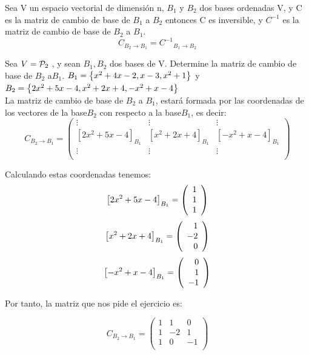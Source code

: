 \begin{theorem}[Corolario]
Sea V un espacio vectorial de dimensión n, $B_1$ y $B_2$  dos bases ordenadas V, y C es la matriz de cambio de base de $B_1$ a $B_2$ entonces C es inversible, y $C^{-1}$ es la matriz de cambio de base de $B_2$ a $B_1$.
\[
C_{B_2\rightarrow B_1 }={C^{-1}}_{B_1 \rightarrow B_2}\]
\end{theorem}

\begin{ejemplo}
Sea $V=\mathcal{P}_2$ , y sean $B_1, B_2$ dos bases de V. Determine la matriz de cambio de base de $B_2$ a$ B_1$. $ B_1= \left\{x^2+4x-2,x-3,x^2+1 \right\} $  y $B_2= \left\{2x^2+5x-4,x^2+2x+4,-x^2+x-4 \right\} $
~\\

La matriz de cambio de base de $B_2$ a $B_1$, estará formada por las coordenadas de los vectores de la base$ B_2$ con respecto a la base$ B_1$, es decir:
\[C_{B_2 \rightarrow B_1}= \left(\begin{array}{ccc}
\vdots & \vdots & \vdots \\
\left[2x^2+5x-4\right]_{B_1}&\left[x^2+2x+4\right]_{B_1}&  \left[-x^2+x-4\right]_{B_1}\\
\vdots & \vdots &  \vdots\\
\end{array}
\right)\]

Calculando estas coordenadas tenemos:
\[\left[2x^2+5x-4\right]_{B_1}=\left( \begin{array}{r} 1\\ 1\\ 1 \end{array} \right) \]
\[\left[x^2+2x+4\right]_{B_1}=\left( \begin{array}{r} 1\\ -2\\ 0 \end{array} \right) \]
\[\left[-x^2+x-4\right]_{B_1}=\left( \begin{array}{r} 0\\ 1\\ -1 \end{array} \right) \]

Por tanto, la matriz que nos pide el ejercicio es:

\[C_{B_2 \rightarrow B_1}= \left(\begin{array}{rrr}
1 & 1 & 0 \\
1&-2& 1\\
1 & 0 &  -1\\
\end{array}
\right)\]




\end{ejemplo}
